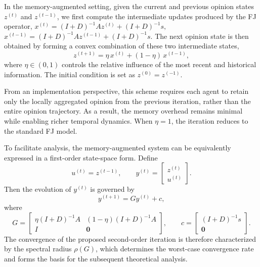 \documentclass[sigconf,review, nonacm]{acmart}
\newcommand\cc{\boldsymbol{\mathit{c}}}
\newcommand\s{\boldsymbol{\mathit{s}}}
\newcommand\uu{\boldsymbol{\mathit{u}}}
\newcommand\xx{\boldsymbol{\mathit{x}}}
\newcommand\yy{\boldsymbol{\mathit{y}}}
\newcommand\zz{\boldsymbol{\mathit{z}}}
\renewcommand\AA{\boldsymbol{\mathit{A}}}
\newcommand\DD{\boldsymbol{\mathit{D}}}
\newcommand\II{\boldsymbol{\mathit{I}}}
\newcommand\GG{\boldsymbol{\mathit{G}}}
\begin{document}
In the memory-augmented setting, given the current and previous opinion states
$\zz^{(t)}$ and $\zz^{(t-1)}$, we first compute the intermediate updates produced
by the FJ operator,
${\xx}^{(t)} = (\II+\DD)^{-1}\AA \zz^{(t)}+(\II+\DD)^{-1}\s, \,$
${\xx}^{(t-1)} = (\II+\DD)^{-1}\AA \zz^{(t-1)}+(\II+\DD)^{-1}\s.$
The next opinion state is then obtained by forming a convex combination of these
two intermediate states,
\[
\zz^{(t+1)} = \eta\, {\xx}^{(t)} + (1-\eta)\, {\xx}^{(t-1)},
\]
where $\eta \in (0,1)$ controls the relative influence of the most recent and
historical information.
The initial condition is set as $\zz^{(0)} = \zz^{(-1)}$.

From an implementation perspective, this scheme requires each agent to retain only the locally aggregated opinion from the previous iteration, rather than the entire opinion trajectory.
As a result, the memory overhead remains minimal while enabling richer temporal dynamics.
When $\eta = 1$, the iteration reduces to the standard FJ model.

To facilitate analysis, the memory-augmented system can be equivalently expressed
in a first-order state-space form.
Define
\[
\uu^{(t)} = \zz^{(t-1)}, \qquad
\yy^{(t)} =
\begin{bmatrix}
	\zz^{(t)} \\
	\uu^{(t)}
\end{bmatrix}.
\]
Then the evolution of $\yy^{(t)}$ is governed by
\[
\yy^{(t+1)} = \GG \yy^{(t)} + \cc,
\]
where
\[
\GG =
\begin{bmatrix}
	\eta(\II+\DD)^{-1}\AA & (1-\eta)(\II+\DD)^{-1}\AA \\
	\II & \mathbf{0}
\end{bmatrix},
\qquad
\cc =
\begin{bmatrix}
	(\II+\DD)^{-1}\s \\
	\mathbf{0}
\end{bmatrix}.
\]
The convergence of the proposed second-order iteration is therefore characterized
by the spectral radius $\rho(\GG)$, which determines the worst-case convergence
rate and forms the basis for the subsequent theoretical analysis.
\end{document}
